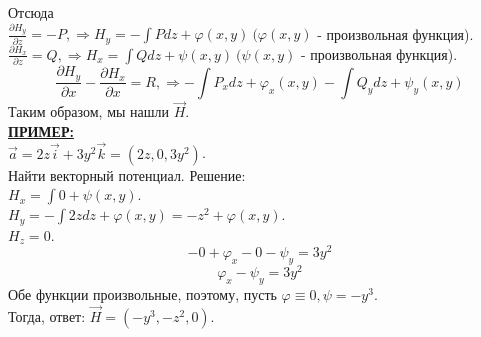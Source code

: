 \documentclass[12pt]{article}
\begin{document}
Отсюда \\$\frac{\partial H_y}{\partial z} = -P, \Rightarrow H_y = -\int Pdz + \varphi(x,y) \ (\varphi(x,y)$ - произвольная функция).\\
\indent $\frac{\partial H_x}{\partial z} = Q, \Rightarrow H_x = \int Qdz + \psi(x,y) \ (\psi(x,y)$ - произвольная функция).\\
$$\frac{\partial H_y}{\partial x} - \frac{\partial H_x}{\partial x} = R, \Rightarrow -\int P_x dz + \varphi_x(x,y) - \int Q_y dz + \psi_y(x,y)$$
Таким образом, мы нашли $\overrightarrow{H}$.\\
\uline{\textbf{ПРИМЕР:}}\\
$\overrightarrow{a} = 2 z \overrightarrow{i} + 3 y^2 \overrightarrow{k} = (2z, 0, 3y^2)$.\\
Найти векторный потенциал. Решение:\\
$H_x = \int 0 + \psi (x,y)$.\\
$H_y = -\int 2z dz + \varphi (x,y) = -z^2 + \varphi(x,y)$.\\
$H_z = 0$.\\
$$-0 + \varphi_x - 0 - \psi_y = 3y^2$$
$$\varphi_x - \psi_y = 3y^2$$
Обе функции произвольные, поэтому, пусть $\varphi \equiv 0, \psi = -y^3$.\\
Тогда, ответ: $\overrightarrow{H} = (-y^3, -z^2, 0)$.\\
\end{document}
